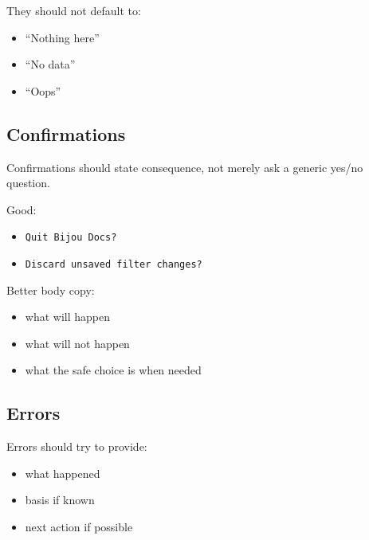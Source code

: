 They should not default to:

\begin{itemize}
\tightlist
\item
  ``Nothing here''
\item
  ``No data''
\item
  ``Oops''
\end{itemize}

\subsection{Confirmations}\label{record-040-confirmations}

Confirmations should state consequence, not merely ask a generic yes/no question.

Good:

\begin{itemize}
\tightlist
\item
  \texttt{Q\allowbreak{}u\allowbreak{}i\allowbreak{}t\allowbreak{} \allowbreak{}B\allowbreak{}i\allowbreak{}j\allowbreak{}o\allowbreak{}u\allowbreak{} \allowbreak{}D\allowbreak{}o\allowbreak{}c\allowbreak{}s\allowbreak{}?}
\item
  \texttt{D\allowbreak{}i\allowbreak{}s\allowbreak{}c\allowbreak{}a\allowbreak{}r\allowbreak{}d\allowbreak{} \allowbreak{}u\allowbreak{}n\allowbreak{}s\allowbreak{}a\allowbreak{}v\allowbreak{}e\allowbreak{}d\allowbreak{} \allowbreak{}f\allowbreak{}i\allowbreak{}l\allowbreak{}t\allowbreak{}e\allowbreak{}r\allowbreak{} \allowbreak{}c\allowbreak{}h\allowbreak{}a\allowbreak{}n\allowbreak{}g\allowbreak{}e\allowbreak{}s\allowbreak{}?}
\end{itemize}

Better body copy:

\begin{itemize}
\tightlist
\item
  what will happen
\item
  what will not happen
\item
  what the safe choice is when needed
\end{itemize}

\subsection{Errors}\label{record-040-errors}

Errors should try to provide:

\begin{itemize}
\tightlist
\item
  what happened
\item
  basis if known
\item
  next action if possible
\end{itemize}


